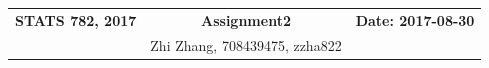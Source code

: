 \documentclass[11pt]{report}
\theoremstyle{definition}
\theoremstyle{remark}
\begin{document}
\setlength\extrarowheight{3pt}
\begin{tabular*}{\textwidth}{ @{} l @{\extracolsep\fill} c @{\extracolsep\fill} r @{}}
  \hline
  \textbf{STATS 782, 2017} & \textbf{Assignment2} & \textbf{Date: 2017-08-30} \\
   & Zhi Zhang, 708439475, zzha822 & \\
  \hline
\end{tabular*}
\end{document}
